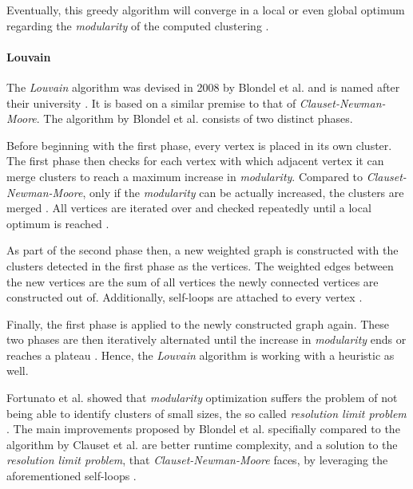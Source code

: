 \documentclass[12pt,a4paper]{report}
\begin{document}
Eventually, this greedy algorithm will converge in a local or even global
optimum regarding the \textit{modularity} of the computed clustering
\cite{clauset2004modularity}.

\paragraph{Louvain \cite{blondel2008modularity}}
The \textit{Louvain} algorithm was devised in 2008 by Blondel et al. and is
named after their university \cite{blondel2008modularity}.
It is based on a similar premise to that of \textit{Clauset-Newman-Moore}.
The algorithm by Blondel et al. consists of two distinct phases.

Before beginning with the first phase, every vertex is placed in its own cluster.
The first phase then checks for each vertex with which adjacent vertex it can
merge clusters to reach a maximum increase in \textit{modularity}.
Compared to \textit{Clauset-Newman-Moore}, only if the \textit{modularity}
can be actually increased, the clusters are merged \cite{blondel2008modularity}.
All vertices are iterated over and checked repeatedly until a local optimum
is reached \cite{blondel2008modularity}.

As part of the second phase then, a new weighted graph is constructed with
the clusters detected in the first phase as the vertices.
The weighted edges between the new vertices are the sum of all vertices
the newly connected vertices are constructed out of.
Additionally, self-loops are attached to every vertex \cite{blondel2008modularity}.

Finally, the first phase is applied to the newly constructed graph again.
These two phases are then iteratively alternated until the increase in
\textit{modularity} ends or reaches a plateau \cite{blondel2008modularity}.
Hence, the \textit{Louvain} algorithm is working with a heuristic as well.

Fortunato et al. showed that \textit{modularity} optimization suffers
the problem of not being able to identify clusters of small sizes, the so called
\textit{resolution limit problem} \cite{fortunato2007resolution}.
The main improvements proposed by Blondel et al. specifially compared
to the algorithm by Clauset et al. are better runtime complexity, and a solution
to the \textit{resolution limit problem}, that \textit{Clauset-Newman-Moore}
faces, by leveraging the aforementioned self-loops \cite{blondel2008modularity}.
\end{document}
